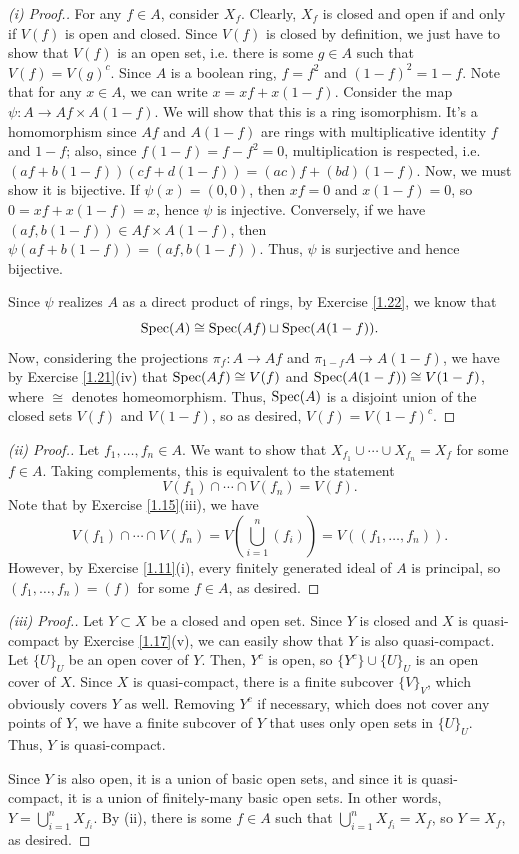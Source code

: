 \begin{proof}[(i) Proof.]
For any $f \in A$, consider $X_f$. Clearly, $X_f$ is closed and open if and only if $V(f)$ is open and closed. Since $V(f)$ is closed by definition, we just have to show that $V(f)$
is an open set, i.e. there is some $g \in A$ such that $V(f) = V(g)^c$. Since $A$ is a boolean ring, $f = f^2$ and $(1-f)^2 = 1-f$. Note that for any $x \in A$,
we can write $x = xf + x(1-f)$. Consider the map  $\psi : A \to Af \times A(1-f)$. We will show that this is a ring isomorphism. It's a homomorphism since $Af$ and $A(1-f)$ are rings
with multiplicative identity $f$ and $1-f$; also, since $f(1 - f) = f - f^2 = 0$, multiplication is respected, i.e. 
$(af + b(1-f))(cf + d(1-f)) = (ac)f + (bd)(1-f)$. Now, we must show it is bijective. If $\psi(x) = (0,0)$, then $xf = 0$ and $x(1-f) = 0$, so $0 = xf + x(1-f) = x$, hence $\psi$ is 
injective. Conversely, if we have $(af, b(1-f)) \in Af \times A(1-f)$, then $\psi(af + b(1-f)) = (af, b(1-f))$. Thus, $\psi$ is surjective and hence bijective.

Since $\psi$ realizes $A$ as a direct product of rings, by Exercise \ref{1.22}, we know that 
$$\operatorname{Spec}(A) \cong \operatorname{Spec}(Af) \sqcup \operatorname{Spec}(A(1-f)).$$
Now, considering the projections $\pi_f : A \to Af$ and $\pi_{1-f} A \to A(1-f)$, we have by Exercise \ref{1.21}(iv) that $\operatorname{Spec}(Af) \cong V(f)$ and $\operatorname{Spec}(A(1-f)) \cong V(1-f)$, where $\cong$
denotes homeomorphism. Thus, $\operatorname{Spec}(A)$ is a disjoint union of the closed sets $V(f)$ and $V(1-f)$, so as desired, $V(f) = V(1-f)^c$.
\end{proof}

\begin{proof}[(ii) Proof.]
Let $f_1,\ldots,f_n \in A$. We want to show that $X_{f_1} \cup \cdots \cup X_{f_n} = X_f$ for some $f \in A$. Taking complements, this is equivalent to the statement
$$V(f_1) \cap \cdots \cap V(f_n) = V(f).$$
Note that by Exercise \ref{1.15}(iii), we have
$$V(f_1) \cap \cdots \cap V(f_n) = V\left(\bigcup_{i=1}^n (f_i)\right) = V((f_1,\ldots,f_n)).$$
However, by Exercise \ref{1.11}(i), every finitely generated ideal of $A$ is principal, so $(f_1,\ldots,f_n) = (f)$ for some $f \in A$, as desired.
\end{proof}

\begin{proof}[(iii) Proof.]
Let $Y \subset X$ be a closed and open set. Since $Y$ is closed and $X$ is quasi-compact by Exercise \ref{1.17}(v), we can easily show that $Y$ is also quasi-compact. Let $\{U\}_U$ be an open cover of 
$Y$. Then, $Y^c$ is open, so $\{Y^c\}\cup\{U\}_U$ is an open cover of $X$. Since $X$ is quasi-compact, there is a finite subcover $\{V\}_V$, which obviously covers $Y$ as well. Removing $Y^c$ if necessary, which
does not cover any points of $Y$, we have a finite subcover of $Y$ that uses only open sets in $\{U\}_U$. Thus, $Y$ is quasi-compact.

Since $Y$ is also open, it is a union of basic open sets, and since it is quasi-compact, it is a union of finitely-many basic open sets. In other words, $Y = \bigcup_{i=1}^n X_{f_i}$. By (ii), there is some $f \in A$
such that $\bigcup_{i=1}^n X_{f_i} = X_f$, so $Y = X_f$, as desired.
\end{proof}

